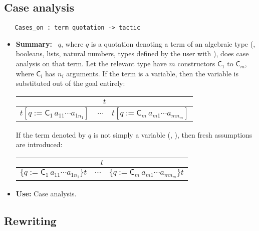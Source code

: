 \subsection{Case analysis}

\begin{holboxed}
\begin{verbatim}
   Cases_on : term quotation -> tactic
\end{verbatim}
\end{holboxed}

\begin{itemize}

\item{\bf Summary:}
~$q$, where $q$ is a quotation denoting a term of an algebraic type (\eg, booleans, lists, natural numbers, types defined by the user with ), does case analysis on that term.
Let the relevant type have $m$ constructors $\textsf{C}_1$ to $\textsf{C}_m$, where $\textsf{C}_i$ has $n_i$ arguments.
If the term is a variable, then the variable is substituted out of the goal entirely:

\begin{center}
\begin{tabular}{c} \\
$t$
\\ \hline \hline
$t[q := \textsf{C}_1\,a_{11}\cdots a_{1n_1}]\quad\cdots\quad
t[q := \textsf{C}_m\,a_{m1}\cdots a_{mn_m}]$
\\
\end{tabular}
\end{center}

If the term denoted by $q$ is not simply a variable (\eg, ), then fresh assumptions are introduced:
\begin{center}
\begin{tabular}{c} \\
$t$
\\ \hline \hline
$\{q := \textsf{C}_1\,a_{11}\cdots a_{1n_1}\}t\quad\cdots\quad
\{q := \textsf{C}_m\,a_{m1}\cdots a_{mn_m}\}t$
\\
\end{tabular}
\end{center}
\item{\bf Use:} Case analysis.
\end{itemize}

\subsection{Rewriting}
\label{rewrite}

